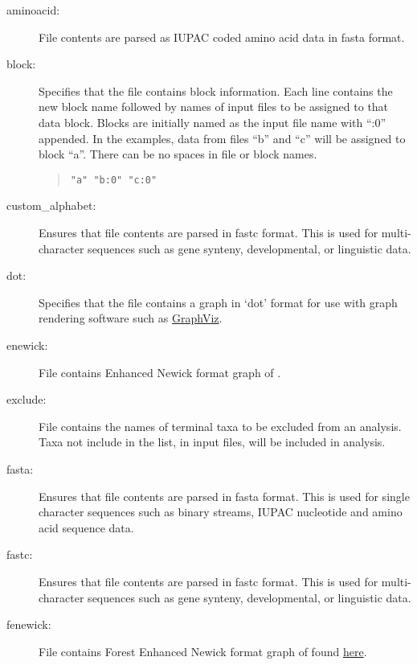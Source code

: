 	\begin{description}
		\item [aminoacid:] File contents are parsed as IUPAC coded amino acid data in fasta 
		\citep{PearsonandLipman1988} format.

		\item [block:] Specifies that the file contains block information. Each line contains 
		the new block name followed by names of input files to be assigned to that data block. 
		Blocks are initially named as the input file name with ``:0'' appended. 
		In the examples, data from files ``b'' and ``c'' will be assigned to block ``a''. There can be no spaces in 
		file or block names.
			
			\begin{quote}
					\texttt{"a" "b:0" "c:0"}\\
			\end{quote}
			
		\item [custom\_alphabet:] Ensures that file contents are parsed in fastc \citep{WheelerandWashburn2019} 
		format. This is used for multi-character sequences such as gene synteny, developmental, or linguistic data.
			
		\item [dot:] Specifies that the file contains a graph in `dot' format for use with graph rendering software 
		such as \href{https://en.wikipedia.org/wiki/Graphviz}{GraphViz}.
			
		\item [enewick:] File contains Enhanced Newick format graph of \cite{Cardonaetal2008}.
			
		\item [exclude:] File contains the names of terminal taxa to be excluded from an analysis. Taxa not 
		include in the list, in input files, will be included in analysis. 
			
		\item [fasta:] Ensures that file contents are parsed in fasta \citep{PearsonandLipman1988} format. 
		This is used for single character sequences such as binary streams, IUPAC nucleotide and amino 
		acid sequence data.
			
		\item [fastc:] Ensures that file contents are parsed in fastc \citep{WheelerandWashburn2019} format. 
		This is used for multi-character sequences such as gene synteny, developmental, or linguistic data.
			
		\item [fenewick:] File contains Forest Enhanced Newick format graph of \cite{Wheeler2021a} found 
		\href{https://www.github.com/wardwheeler/euncon}{here}.
			

\end{description}
